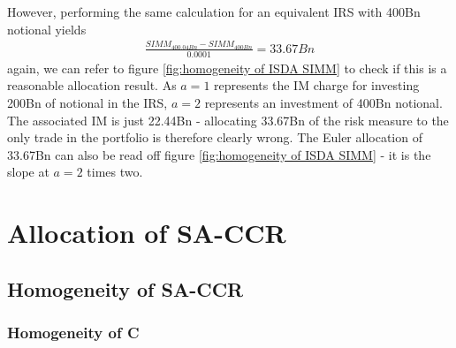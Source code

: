 \documentclass[../Thesis_AHoecherl.tex]{subfiles}
\begin{document}
    However, performing the same calculation for an equivalent IRS with 400Bn notional yields
    \begin{align*}
        \frac{SIMM_{400.04Bn} - SIMM_{400Bn}}{0.0001} = 33.67Bn
    \end{align*}
    again, we can refer to figure \ref{fig:homogeneity of ISDA SIMM} to check if this is a reasonable allocation result. As $a=1$ represents the IM charge for investing 200Bn of notional in the IRS, $a=2$ represents an investment of 400Bn notional. The associated IM is just 22.44Bn - allocating 33.67Bn of the risk measure to the only trade in the portfolio is therefore clearly wrong. The Euler allocation of 33.67Bn can also be read off figure \ref{fig:homogeneity of ISDA SIMM} - it is the slope at $a=2$ times two.

    



    \section{Allocation of SA-CCR}\label{Allocation of SA-CCR}

    \subsection{Homogeneity of SA-CCR}

    \subsubsection{Homogeneity of C}
\end{document}
